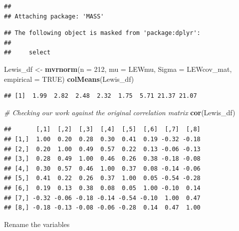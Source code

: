 \documentclass[
  11pt,
]{book}
\newenvironment{Shaded}{\begin{snugshade}}{\end{snugshade}}
\newcommand{\AttributeTok}[1]{\textcolor[rgb]{0.27,0.27,0.27}{#1}}
\newcommand{\CommentTok}[1]{\textcolor[rgb]{0.37,0.37,0.37}{\textit{#1}}}
\newcommand{\ConstantTok}[1]{\textcolor[rgb]{0.37,0.37,0.37}{#1}}
\newcommand{\DecValTok}[1]{\textcolor[rgb]{0.06,0.06,0.06}{#1}}
\newcommand{\FunctionTok}[1]{\textcolor[rgb]{0.27,0.27,0.27}{\textbf{#1}}}
\newcommand{\NormalTok}[1]{#1}
\newcommand{\OtherTok}[1]{\textcolor[rgb]{0.37,0.37,0.37}{#1}}
\begin{document}
\begin{verbatim}
## 
## Attaching package: 'MASS'
\end{verbatim}

\begin{verbatim}
## The following object is masked from 'package:dplyr':
## 
##     select
\end{verbatim}

\begin{Shaded}
\begin{Highlighting}[]
\NormalTok{Lewis\_df }\OtherTok{\textless{}{-}} \FunctionTok{mvrnorm}\NormalTok{(}\AttributeTok{n =} \DecValTok{212}\NormalTok{, }\AttributeTok{mu =}\NormalTok{ LEWmu, }\AttributeTok{Sigma =}\NormalTok{ LEWcov\_mat, }\AttributeTok{empirical =} \ConstantTok{TRUE}\NormalTok{)}
\FunctionTok{colMeans}\NormalTok{(Lewis\_df)}
\end{Highlighting}
\end{Shaded}

\begin{verbatim}
## [1]  1.99  2.82  2.48  2.32  1.75  5.71 21.37 21.07
\end{verbatim}

\begin{Shaded}
\begin{Highlighting}[]
\CommentTok{\# Checking our work against the original correlation matrix}
\FunctionTok{cor}\NormalTok{(Lewis\_df)}
\end{Highlighting}
\end{Shaded}

\begin{verbatim}
##       [,1]  [,2]  [,3]  [,4]  [,5]  [,6]  [,7]  [,8]
## [1,]  1.00  0.20  0.28  0.30  0.41  0.19 -0.32 -0.18
## [2,]  0.20  1.00  0.49  0.57  0.22  0.13 -0.06 -0.13
## [3,]  0.28  0.49  1.00  0.46  0.26  0.38 -0.18 -0.08
## [4,]  0.30  0.57  0.46  1.00  0.37  0.08 -0.14 -0.06
## [5,]  0.41  0.22  0.26  0.37  1.00  0.05 -0.54 -0.28
## [6,]  0.19  0.13  0.38  0.08  0.05  1.00 -0.10  0.14
## [7,] -0.32 -0.06 -0.18 -0.14 -0.54 -0.10  1.00  0.47
## [8,] -0.18 -0.13 -0.08 -0.06 -0.28  0.14  0.47  1.00
\end{verbatim}

Rename the variables
\end{document}
